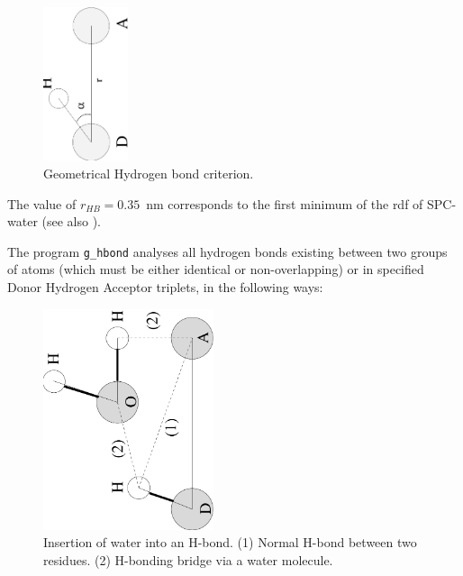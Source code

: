 \begin{figure}
\centerline{\includegraphics[width=2.5cm,angle=270]{plots/hbond}}
\caption{Geometrical Hydrogen bond criterion.}
\label{fig:hbond}
\end{figure}

The value of $r_{HB} = 0.35$~nm corresponds to the first minimum of the rdf of 
SPC-water (see also ).

The program {\tt g\_hbond} analyses all hydrogen bonds existing
between two groups of atoms (which must be either identical or
non-overlapping) or in specified Donor Hydrogen Acceptor triplets, in
the following ways:

\begin{figure}
\centerline{
{\includegraphics[width=5cm,angle=270]{plots/hbond_insert}}}
\caption[Insertion of water into an H-bond.]{Insertion of water into
an H-bond. (1) Normal H-bond between two residues. (2) H-bonding
bridge via a water molecule.}
\label{fig:insert}
\end{figure}

